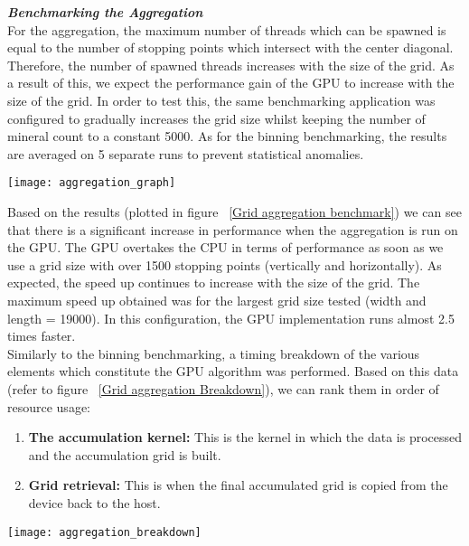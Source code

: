 \documentclass[11pt]{IEEEtran}
\begin{document}
\textbf{\textit{Benchmarking the Aggregation}}\\
For the aggregation, the maximum number of threads which can be spawned is equal to the number of stopping points which intersect with the center diagonal. Therefore, the number of spawned threads increases with the size of the grid. As a result of this, we expect the performance gain of the GPU to increase with the size of the grid. In order to test this, the same benchmarking application was configured to gradually increases the grid size whilst keeping the number of mineral count to a constant 5000. As for the binning benchmarking, the results are averaged on 5 separate runs to prevent statistical anomalies.\\

\begin{figure*}[ht]
\begin{center}
\caption[grid]{Grid aggregation benchmark}
\label{Grid aggregation benchmark}
\texttt{[image: aggregation\_graph]}
\end{center}
\end{figure*}

Based on the results (plotted in figure ~\ref{Grid aggregation benchmark}) we can see that there is a significant increase in performance when the aggregation is run on the GPU. The GPU overtakes the CPU in terms of performance as soon as we use a grid size with over 1500 stopping points (vertically and horizontally).
As expected, the speed up continues to increase with the size of the grid. The maximum speed up obtained was for the largest grid size tested (width and length = 19000). In this configuration, the GPU implementation runs almost 2.5 times faster.\\

Similarly to the binning benchmarking, a timing breakdown of the various elements which constitute the GPU algorithm was performed. Based on this data (refer to figure ~\ref{Grid aggregation Breakdown}), we can rank them in order of resource usage:
\begin{enumerate}
\item \textbf{The accumulation kernel: } This is the kernel in which the data is processed and the accumulation grid is built.
\item \textbf{Grid retrieval: } This is when the final accumulated grid is copied from the device back to the host.
\end{enumerate}

\begin{figure*}[ht]
\begin{center}
\caption[grid]{Grid accumulation breakdown}
\label{Grid accumulation Breakdown}
\texttt{[image: aggregation\_breakdown]}
\end{center}
\end{figure*}
\end{document}
